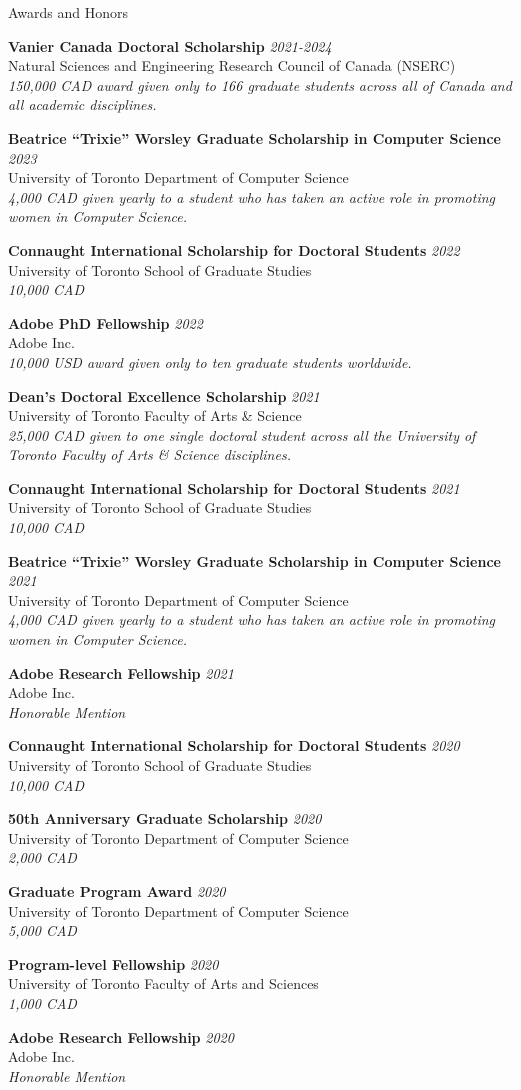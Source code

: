 \documentclass{resume}
\newcommand{\cvitembig}[4]{
    {\bf #1} \hfill {\em \small #2} \\ 
    {\small#3 }\\
    {\it \small #4}
}
\begin{document}
\begin{rSection}{Awards and Honors}

\cvitembig{Vanier Canada Doctoral Scholarship}{2021-2024}{Natural Sciences and Engineering Research Council of Canada (NSERC)}{150,000 CAD award given only to 166 graduate students across all of Canada and all academic disciplines.}

\cvitembig{Beatrice ``Trixie'' Worsley Graduate Scholarship in Computer Science}{2023}{University of Toronto Department of Computer Science}{4,000 CAD given yearly to a student who has taken an active role in promoting women in Computer Science.}

\cvitembig{Connaught International Scholarship for Doctoral Students}{2022}{University of Toronto School of Graduate Studies}{10,000 CAD}

\cvitembig{Adobe PhD Fellowship}{2022}{Adobe Inc.}{10,000 USD award given only to ten graduate students worldwide.}

\cvitembig{Dean's Doctoral Excellence Scholarship}{2021}{University of Toronto Faculty of Arts \& Science}{25,000 CAD given to one single doctoral student across all the University of Toronto Faculty of Arts \& Science disciplines.}

\cvitembig{Connaught International Scholarship for Doctoral Students}{2021}{University of Toronto School of Graduate Studies}{10,000 CAD}

\cvitembig{Beatrice ``Trixie'' Worsley Graduate Scholarship in Computer Science}{2021}{University of Toronto Department of Computer Science}{4,000 CAD given yearly to a student who has taken an active role in promoting women in Computer Science.}

\cvitembig{Adobe Research Fellowship}{2021}{Adobe Inc.}{Honorable Mention}

\cvitembig{Connaught International Scholarship for Doctoral Students}{2020}{University of Toronto School of Graduate Studies}{10,000 CAD}

\cvitembig{50th Anniversary Graduate Scholarship}{2020}{University of Toronto Department of Computer Science}{2,000 CAD}

\cvitembig{Graduate Program Award}{2020}{University of Toronto Department of Computer Science}{5,000 CAD}

\cvitembig{Program-level Fellowship}{2020}{University of Toronto Faculty of Arts and Sciences}{1,000 CAD}

\cvitembig{Adobe Research Fellowship}{2020}{Adobe Inc.}{Honorable Mention}


\end{rSection}
\end{document}
